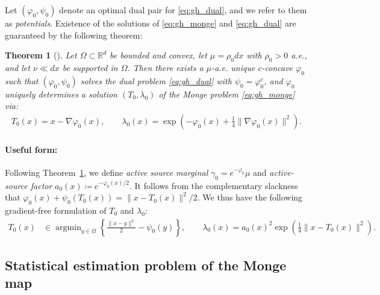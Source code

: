 \documentclass[11pt,reqno]{amsart}
\newtheorem{theorem}{Theorem}
\theoremstyle{definition}
\newcommand{\R}{\mathbb{R}}
\DeclareMathOperator*{\argmin}{arg min}
\begin{document}
Let $(\varphi_0,\psi_0)$ denote an optimal dual pair for \eqref{eq:gh_dual}, and we refer to them as \emph{potentials}.  Existence of the solutions of \eqref{eq:gh_monge} and \eqref{eq:gh_dual} are guaranteed by the following theorem:
\begin{theorem}[{\cite{gallouet2025regularity}}]
\label{prop:monge-potential}
Let $\Omega\subset\R^d$ be bounded and convex, let $\mu=\rho_0dx$ with $\rho_0>0$ a.e., and let $\nu\ll dx$ be supported in $\Omega$. Then there exists a $\mu$-a.e. unique $c$-concave $\varphi_0$ such that $(\varphi_0,\psi_0)$ solves the dual problem \eqref{eq:gh_dual} with $\psi_0 = \varphi^c_0$, and $\varphi_0$ uniquely determines a solution $(T_0,\lambda_0)$ of the Monge problem \eqref{eq:gh_monge} via:
\begin{align}\label{eq:unique}
    T_0(x)=x-\nabla \varphi_0(x),
    \qquad
    \lambda_0(x)=\exp\left(-\varphi_0(x)+\frac1{4}\|\nabla \varphi_0(x)\|^2\right).
\end{align}
\end{theorem}
\paragraph{Useful form:} Following Theorem~\ref{prop:monge-potential}, we define \emph{active source marginal} $\gamma_0=e^{-\varphi_0}\mu$ and \emph{active-source factor} $a_0(x)\coloneqq e^{-\varphi_0(x)/2}$.
It follows from the complementary slackness that $\varphi_0(x) + \psi_0(T_0(x)) = \| x - T_0(x) \|^2/2$. We thus have the following gradient-free formulation of $T_0$ and $\lambda_0$:
\begin{align} \label{eq:convenient}
    T_0(x)
    &\in
    \argmin_{y\in\Omega}
    \left\{
        \frac{\|x-y\|^2}{2}-\psi_0(y)
    \right\},
    \qquad
    \lambda_0(x)
    =a_0(x)^2
    \exp\left(\frac14\|x-T_0(x)\|^2\right) .
\end{align}







\subsection{Statistical estimation problem of the Monge map}
\end{document}
